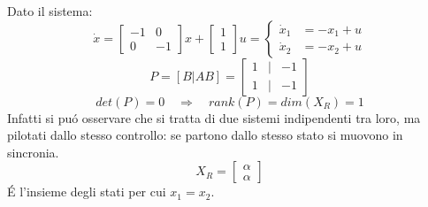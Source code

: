 \documentclass[../main.tex]{subfiles}
\begin{document}
		\begin{Exercise}[title={Calcolo di $ X_R $ e decomposizione di raggiungibilit\'a}, difficulty=1]
			Dato il sistema:
			\[
				\dot x =
				\begin{bmatrix}
					-1 & 0\\
					0 & -1
				\end{bmatrix} x +
				\begin{bmatrix}
					1\\
					1
				\end{bmatrix} u =
				\begin{cases}
					\dot x_1 &= -x_1+u\\
					\dot x_2 &= -x_2+u
				\end{cases}
			\]
			\[
				P = \left[ B | AB \right] =
				\begin{bmatrix}
					1 & | & -1\\
					1 & | & -1
				\end{bmatrix}
			\]
			\[ det(P) = 0 \quad\Rightarrow\quad rank(P) = dim(X_R) = 1 \]
			Infatti si pu\'o osservare che si tratta di due sistemi indipendenti tra loro, ma pilotati dallo stesso controllo: se partono dallo stesso stato si muovono in sincronia.
			\[
				X_R = \begin{bmatrix}
					\alpha\\
					\alpha
				\end{bmatrix}
			\]
			\'E l'insieme degli stati per cui $ x_1 = x_2 $.
			\newline
			

\end{Exercise}
\end{document}
